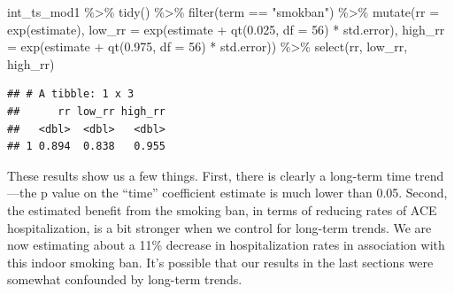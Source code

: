 \documentclass[
]{book}
\newenvironment{Shaded}{\begin{snugshade}}{\end{snugshade}}
\newcommand{\AttributeTok}[1]{\textcolor[rgb]{0.77,0.63,0.00}{#1}}
\newcommand{\DecValTok}[1]{\textcolor[rgb]{0.00,0.00,0.81}{#1}}
\newcommand{\FloatTok}[1]{\textcolor[rgb]{0.00,0.00,0.81}{#1}}
\newcommand{\FunctionTok}[1]{\textcolor[rgb]{0.00,0.00,0.00}{#1}}
\newcommand{\NormalTok}[1]{#1}
\newcommand{\SpecialCharTok}[1]{\textcolor[rgb]{0.00,0.00,0.00}{#1}}
\newcommand{\StringTok}[1]{\textcolor[rgb]{0.31,0.60,0.02}{#1}}
\begin{document}
\begin{Shaded}
\begin{Highlighting}[]
\NormalTok{int\_ts\_mod1 }\SpecialCharTok{\%\textgreater{}\%} 
  \FunctionTok{tidy}\NormalTok{() }\SpecialCharTok{\%\textgreater{}\%} 
  \FunctionTok{filter}\NormalTok{(term }\SpecialCharTok{==} \StringTok{"smokban"}\NormalTok{) }\SpecialCharTok{\%\textgreater{}\%} 
  \FunctionTok{mutate}\NormalTok{(}\AttributeTok{rr =} \FunctionTok{exp}\NormalTok{(estimate), }
         \AttributeTok{low\_rr =} \FunctionTok{exp}\NormalTok{(estimate }\SpecialCharTok{+} \FunctionTok{qt}\NormalTok{(}\FloatTok{0.025}\NormalTok{, }\AttributeTok{df =} \DecValTok{56}\NormalTok{) }\SpecialCharTok{*}\NormalTok{ std.error), }
         \AttributeTok{high\_rr =} \FunctionTok{exp}\NormalTok{(estimate }\SpecialCharTok{+} \FunctionTok{qt}\NormalTok{(}\FloatTok{0.975}\NormalTok{, }\AttributeTok{df =} \DecValTok{56}\NormalTok{) }\SpecialCharTok{*}\NormalTok{ std.error)) }\SpecialCharTok{\%\textgreater{}\%} 
  \FunctionTok{select}\NormalTok{(rr, low\_rr, high\_rr)}
\end{Highlighting}
\end{Shaded}

\begin{verbatim}
## # A tibble: 1 x 3
##      rr low_rr high_rr
##   <dbl>  <dbl>   <dbl>
## 1 0.894  0.838   0.955
\end{verbatim}

These results show us a few things. First, there is clearly a long-term time trend---the p value on the ``time'' coefficient estimate is much lower than 0.05. Second, the estimated benefit from the smoking ban, in terms of reducing rates of ACE hospitalization, is a bit stronger when we control for long-term trends. We are now estimating about a 11\% decrease in hospitalization rates in association with this indoor smoking ban. It's possible that our results in the last sections were somewhat confounded by long-term trends.
\end{document}
